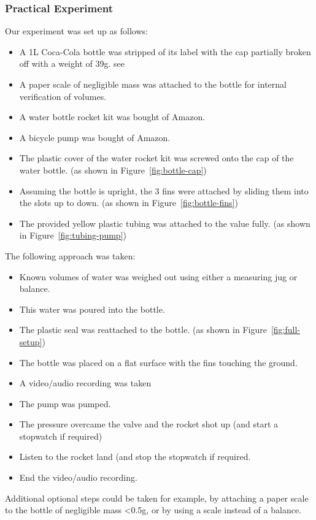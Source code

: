 \documentclass[14pt]{article}
\begin{document}
\subsubsection{Practical Experiment}
Our experiment was set up as follows:
\begin{itemize}
    \item A 1L Coca-Cola bottle was stripped of its label with the cap partially broken off with a weight of 39g. see \cite{2}
    \item A paper scale of negligible mass was attached to the bottle for internal verification of volumes.
    \item A water bottle rocket kit was bought of Amazon.  \cite{3}
    \item A bicycle pump was bought of Amazon.
    \item The plastic cover of the water rocket kit was screwed onto the cap of the water bottle. (as shown in Figure~\ref{fig:bottle-cap})
    \item Assuming the bottle is upright, the 3 fins were attached by sliding them into the slots up to down. (as shown in Figure~\ref{fig:bottle-fins})
    \item The provided yellow plastic tubing was attached to the value fully. (as shown in Figure~\ref{fig:tubing-pump})
\end{itemize}
The following approach was taken:
\begin{itemize}
    \item Known volumes of water was weighed out using either a measuring jug or balance.
    \item This water was poured into the bottle.
    \item The plastic seal was reattached to the bottle. (as shown in Figure~\ref{fig:full-setup})
    \item The bottle was placed on a flat surface with the fins touching the ground.
    \item A video/audio recording was taken
    \item The pump was pumped.
    \item The pressure overcame the valve and the rocket shot up (and start a stopwatch if required)
    \item Listen to the rocket land (and stop the stopwatch if required.
    \item End the video/audio recording.
\end{itemize}
Additional optional steps could be taken for example, by attaching a paper scale to the bottle of negligible mass <0.5g, or by using a scale instead of a balance. 
\end{document}

